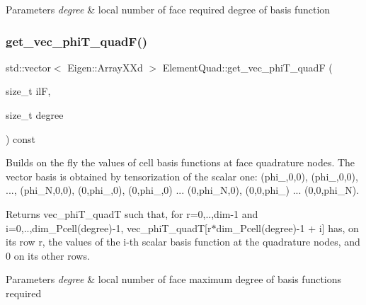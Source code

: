 \begin{DoxyParams}{Parameters}
{\em degree} & local number of face required degree of basis function \\
\hline
\end{DoxyParams}
\mbox{\label{classHArDCore3D_1_1ElementQuad_a318c36aca48d3cdb6b501d3d0e1554cf}} 
\subsubsection{\texorpdfstring{get\+\_\+vec\+\_\+phi\+T\+\_\+quad\+F()}{get\_vec\_phiT\_quadF()}}
{\footnotesize\ttfamily std\+::vector$<$ Eigen\+::\+Array\+X\+Xd $>$ Element\+Quad\+::get\+\_\+vec\+\_\+phi\+T\+\_\+quadF (\begin{DoxyParamCaption}\item[{size\+\_\+t}]{ilF,  }\item[{size\+\_\+t}]{degree }\end{DoxyParamCaption}) const}



Builds on the fly the values of cell basis functions at face quadrature nodes. The vector basis is obtained by tensorization of the scalar one\+: (phi\+\_,0,0), (phi\+\_,0,0), ..., (phi\+\_\+N,0,0), (0,phi\+\_,0), (0,phi\+\_,0) ... (0,phi\+\_\+N,0), (0,0,phi\+\_) ... (0,0,phi\+\_\+N). 

\begin{DoxyReturn}{Returns}
vec\+\_\+phi\+T\+\_\+quadT such that, for r=0,..,dim-\/1 and i=0,..,dim\+\_\+\+Pcell(degree)-\/1, vec\+\_\+phi\+T\+\_\+quadT\mbox{[}r$\ast$dim\+\_\+\+Pcell(degree)-\/1 + i\mbox{]} has, on its row r, the values of the i-\/th scalar basis function at the quadrature nodes, and 0 on its other rows. 
\end{DoxyReturn}

\begin{DoxyParams}{Parameters}
{\em degree} & local number of face maximum degree of basis functions required \\
\hline
\end{DoxyParams}
\mbox{\label{classHArDCore3D_1_1ElementQuad_a0df097bcb15554c9f9ee752f04c14f95}} 
